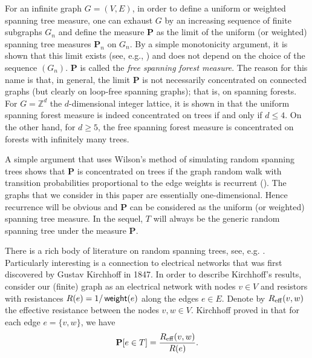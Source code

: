 \documentclass[11pt]{article}
\providecommand{\1}{\mathBB{1}}
\renewcommand{\P}{\mathbf{P}}
\newcommand{\Z}{{\mathbb{Z}}}
\newcommand{\weight}{\mathop{\mbox{\sf weight}}}
\begin{document}
For an infinite graph $G=(V,E)$, in order to define a uniform or weighted spanning tree measure, one can exhaust $G$ by an increasing sequence of finite subgraphs $G_n$ and define the measure $\P$ as the limit of the uniform (or weighted) spanning tree measures $\P_n$ on $G_n$. By a simple monotonicity argument, it is shown that this limit exists (see, e.g., \cite[Proposition 5.6]{BenjaminiLyonsPeresSchramm2001}) and does not depend on the choice of the sequence $(G_n)$. $\P$
is called the \emph{free spanning forest measure}. The reason for this name is that, in general, the limit $\P$ is not necessarily concentrated on connected graphs (but clearly on loop-free spanning graphs); that is, on spanning forests. For $G=\Z^d$ the $d$-dimensional integer lattice, it is shown in \cite{Pemantle1991} that the uniform spanning forest measure is indeed concentrated on trees if and only if $d\leq4$. On the other hand, for $d\geq 5$, the free spanning forest measure is concentrated on forests with infinitely many trees.

A simple argument that uses Wilson's method of simulating random spanning trees shows that $\P$ is concentrated on trees if the graph random walk with transition probabilities proportional to the edge weights is recurrent (\cite[Proposition 5.6]{BenjaminiLyonsPeresSchramm2001}). The graphs that we consider in this paper are essentially one-dimensional. Hence recurrence will be obvious and $\P$ can be considered as the uniform (or weighted) spanning tree measure. In the sequel, $T$ will always be the generic random spanning tree under the measure $\P$.

There is a rich body of literature on random spanning trees, see, e.g.
\cite{AizenmanBurchardNewman1997,AldousSteele1992,Aldous1990,BenjaminiLyonsPeresSchramm2001,
BurtonPemantle1993,
Haggstrom1994,Haggstrom1995b,LawlerSchrammWerner2004,LyonsPeres2016,
Pemantle1991,ProppWilson1998b,Wilson1996}. Particularly interesting is a connection to electrical networks that was first discovered by Gustav Kirchhoff in 1847. In order to describe Kirchhoff's results, consider our (finite) graph as an electrical network with nodes $v\in V$ and resistors with resistances $R(e)=1/\weight(e)$ along the edges $e\in E$. Denote by $R_{\rm eff}(v,w)$ the effective resistance between the nodes $v,w\in V$. Kirchhoff proved in \cite{Kirchhoff1847} that for each edge $e=\{v,w\}$, we have
\begin{equation}
\label{E1.01}
\P[e\in T]=\frac{R_{\rm eff}(v,w)}{R(e)}.
\end{equation}
\end{document}
